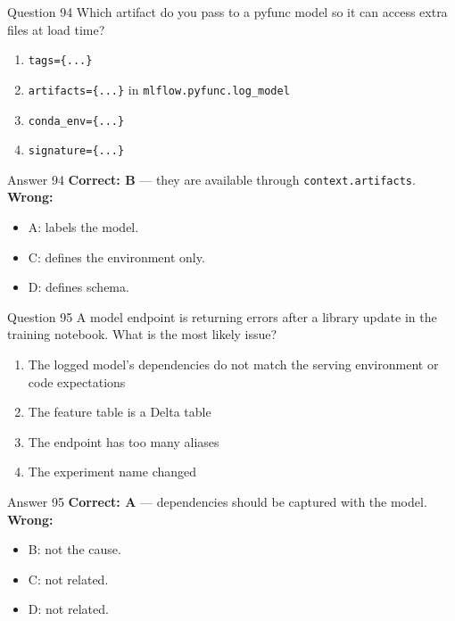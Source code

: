\documentclass[aspectratio=169,11pt]{beamer}
\begin{document}
\begin{frame}{Question 94}
Which artifact do you pass to a pyfunc model so it can access extra files at load time?
\begin{enumerate}[label=\Alph*.]
\item \texttt{tags=\{...\}}
\item \texttt{artifacts=\{...\}} in \texttt{mlflow.pyfunc.log\_model}
\item \texttt{conda\_env=\{...\}}
\item \texttt{signature=\{...\}}
\end{enumerate}
\end{frame}
\begin{frame}{Answer 94}
\textbf{Correct: B} --- they are available through \texttt{context.artifacts}.\\
\vspace{0.5em}
\textbf{Wrong:}
\begin{itemize}
\item A: labels the model.
\item C: defines the environment only.
\item D: defines schema.
\end{itemize}
\end{frame}

\begin{frame}{Question 95}
A model endpoint is returning errors after a library update in the training notebook. What is the most likely issue?
\begin{enumerate}[label=\Alph*.]
\item The logged model's dependencies do not match the serving environment or code expectations
\item The feature table is a Delta table
\item The endpoint has too many aliases
\item The experiment name changed
\end{enumerate}
\end{frame}
\begin{frame}{Answer 95}
\textbf{Correct: A} --- dependencies should be captured with the model.\\
\vspace{0.5em}
\textbf{Wrong:}
\begin{itemize}
\item B: not the cause.
\item C: not related.
\item D: not related.
\end{itemize}
\end{frame}
\end{document}
